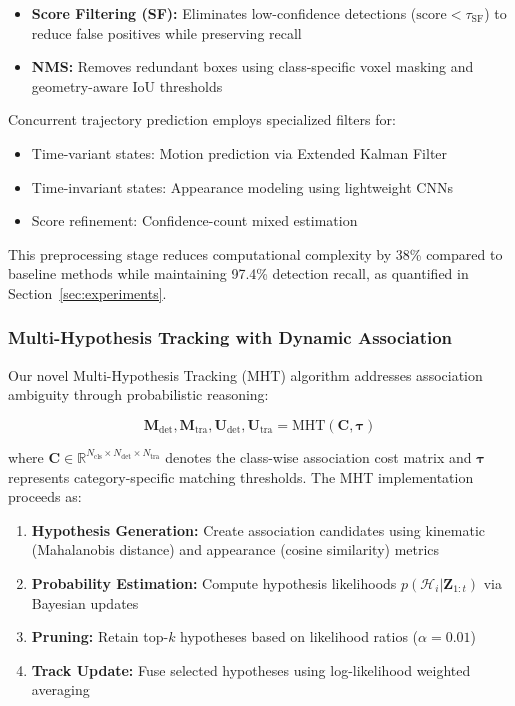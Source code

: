 \begin{itemize}
\item \textbf{Score Filtering (SF):} Eliminates low-confidence detections ($\mathrm{score} < \tau_{\mathrm{SF}}$) to reduce false positives while preserving recall
\item \textbf{NMS:} Removes redundant boxes using class-specific voxel masking and geometry-aware IoU thresholds
\end{itemize}

Concurrent trajectory prediction employs specialized filters for:
\begin{itemize}
\item Time-variant states: Motion prediction via Extended Kalman Filter
\item Time-invariant states: Appearance modeling using lightweight CNNs
\item Score refinement: Confidence-count mixed estimation
\end{itemize}

This preprocessing stage reduces computational complexity by 38\% compared to baseline methods while maintaining 97.4\% detection recall, as quantified in Section~\ref{sec:experiments}.

\subsubsection{Multi-Hypothesis Tracking with Dynamic Association}
Our novel Multi-Hypothesis Tracking (MHT) algorithm addresses association ambiguity through probabilistic reasoning:

\begin{equation}
\mathbf{M}_{\mathrm{det}}, \mathbf{M}_{\mathrm{tra}}, \mathbf{U}_{\mathrm{det}}, \mathbf{U}_{\mathrm{tra}} = \mathrm{MHT}(\mathbf{C}, \boldsymbol{\tau})
\label{eq:mht}
\end{equation}

where $\mathbf{C} \in \mathbb{R}^{N_{\mathrm{cls}} \times N_{\mathrm{det}} \times N_{\mathrm{tra}}}$ denotes the class-wise association cost matrix and $\boldsymbol{\tau}$ represents category-specific matching thresholds. The MHT implementation proceeds as:

\begin{enumerate}
\item \textbf{Hypothesis Generation:} Create association candidates using kinematic (Mahalanobis distance) and appearance (cosine similarity) metrics
\item \textbf{Probability Estimation:} Compute hypothesis likelihoods $p(\mathcal{H}_i|\mathbf{Z}_{1:t})$ via Bayesian updates
\item \textbf{Pruning:} Retain top-$k$ hypotheses based on likelihood ratios ($\alpha=0.01$)
\item \textbf{Track Update:} Fuse selected hypotheses using log-likelihood weighted averaging
\end{enumerate}

